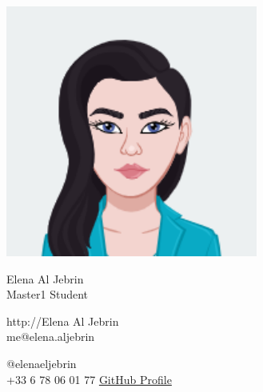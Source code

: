 \documentclass{article}
\begin{document}
\centering \includegraphics[width=.25\linewidth]{logo}\\[2pt]
\parbox{2in}{\Large \centering Elena Al Jebrin\\[1pt]
\normalsize Master1 Student}

\vfill
\raggedright
\begin{multicols}{2}
http://Elena Al Jebrin\\
me@elena.aljebrin

\columnbreak
\raggedleft
@elenaeljebrin\\
+33 6 78 06 01 77%
\href{https://github.com/Elena-aljebrin/Elena-aljebrin.github.io}{GitHub Profile}
\end{multicols}%
\end{document}
